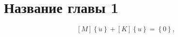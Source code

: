 \chapter{Название главы 1} \label{ch1}


\begin{equation}
\left[M\right]\left\{\ddot{u}\right\}+\left[K\right]\left\{u\right\}=\left\{0\right\},
\end{equation}

